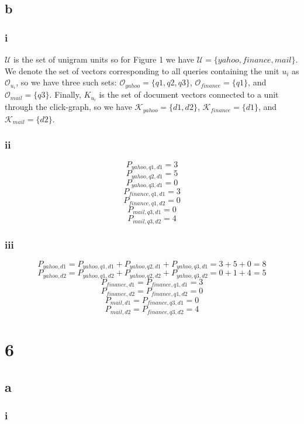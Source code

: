 \documentclass[paper=a4, fontsize=11pt]{scrartcl}
\begin{document}
\subsection*{b}

\subsubsection*{i}

$\mathcal{U}$ is the set of unigram units so for Figure 1 we have
$\mathcal{U} = \{yahoo, finance, mail\}$.
We denote the set of vectors corresponding to all queries containing the unit $u_i$ as
$\mathcal{O}_{u_i}$, so we have three such sets:
$\mathcal{O}_{yahoo} = \{q1, q2, q3\}$,
$\mathcal{O}_{finance} = \{q1\}$, and
$\mathcal{O}_{mail} = \{q3\}$.
Finally, $K_{u_i}$ is the set of document vectors connected to a unit through
the click-graph, so we have
$\mathcal{K}_{yahoo} = \{d1, d2\}$,
$\mathcal{K}_{finance} = \{d1\}$, and
$\mathcal{K}_{mail} = \{d2\}$.

\subsubsection*{ii}

$$P_{yahoo,q1,d1} = 3$$
$$P_{yahoo,q2,d1} = 5$$
$$P_{yahoo,q3,d1} = 0$$
$$P_{finance,q1,d1} = 3$$
$$P_{finance,q1,d2} = 0$$
$$P_{mail,q3,d1} = 0$$
$$P_{mail,q3,d2} = 4$$

\subsubsection*{iii}

$$P_{yahoo,d1} = P_{yahoo,q1,d1} + P_{yahoo,q2,d1} + P_{yahoo,q3,d1} = 3 + 5 + 0 = 8$$
$$P_{yahoo,d2} = P_{yahoo,q1,d2} + P_{yahoo,q2,d2} + P_{yahoo,q3,d2} = 0 + 1 + 4 = 5$$
$$P_{finance,d1} = P_{finance,q1,d1} = 3$$
$$P_{finance,d2} = P_{finance,q1,d2} = 0$$
$$P_{mail,d1} = P_{finance,q3,d1} = 0$$
$$P_{mail,d2} = P_{finance,q3,d2} = 4$$

\section*{6}

\subsection*{a}

\subsubsection*{i}
\end{document}

